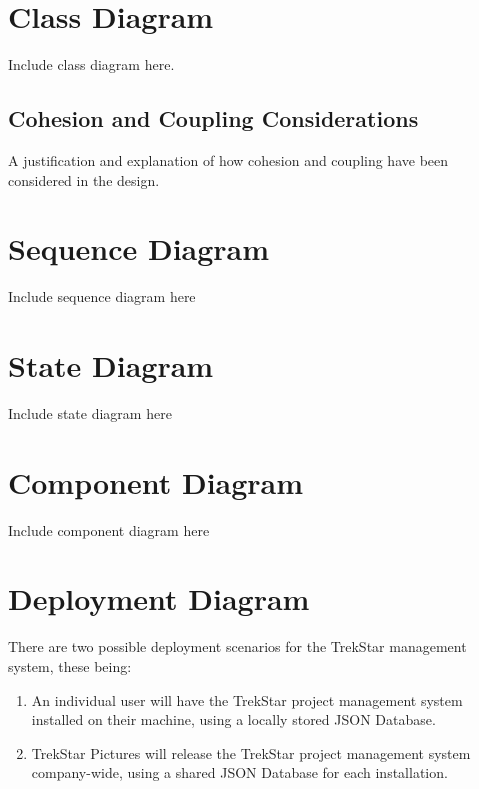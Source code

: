 \documentclass[
  english,
  a4paper,
,tablecaptionabove
]{scrartcl}
\providecommand{\tightlist}{%
  \setlength{\itemsep}{0pt}\setlength{\parskip}{0pt}}
\begin{document}
\newpage

\hypertarget{class-diagram}{%
\section{Class Diagram}\label{class-diagram}}

Include class diagram here.

\hypertarget{cohesion-and-coupling-considerations}{%
\subsection{Cohesion and Coupling
Considerations}\label{cohesion-and-coupling-considerations}}

A justification and explanation of how cohesion and coupling have been
considered in the design.

\newpage

\hypertarget{sequence-diagram}{%
\section{Sequence Diagram}\label{sequence-diagram}}

Include sequence diagram here

\newpage

\hypertarget{state-diagram}{%
\section{State Diagram}\label{state-diagram}}

Include state diagram here

\newpage

\hypertarget{component-diagram}{%
\section{Component Diagram}\label{component-diagram}}

Include component diagram here

\newpage

\hypertarget{deployment-diagram}{%
\section{Deployment Diagram}\label{deployment-diagram}}

There are two possible deployment scenarios for the TrekStar management
system, these being:

\begin{enumerate}
\def\labelenumi{\arabic{enumi}.}
\tightlist
\item
  An individual user will have the TrekStar project management system
  installed on their machine, using a locally stored JSON Database.
\item
  TrekStar Pictures will release the TrekStar project management system
  company-wide, using a shared JSON Database for each installation.
\end{enumerate}
\end{document}
